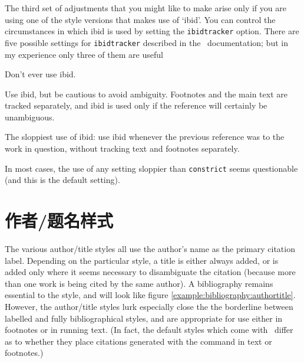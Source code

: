 \label{citations:ibid}
The third set of adjustments that you might like to make arise only if
you are using one of the style versions that makes use of `ibid'. You
can control the circumstances in which ibid is used by setting the
\verb|ibidtracker| option.\label{ibidtracking} There are five possible
settings for \verb|ibidtracker| described in the \biblatex\
documentation; but in my experience only three of them are useful
\begin{description}[font=\ttfamily\upshape]
\item[ibidtracker=false] Don't ever use ibid.
\item[ibidtracker=constrict] Use ibid, but be cautious to avoid
  ambiguity. Footnotes and the main text are tracked separately, and
  ibid is used only if the reference will certainly be unambiguous.
\item[ibidtracker=true] The sloppiest use of ibid: use ibid whenever
  the previous reference was to the work in question, without tracking
  text and footnotes separately.
\end{description}
In most cases, the use of any setting sloppier than \texttt{constrict}
seems questionable (and this is the default setting).

\section{作者/题名样式}

The various author/title styles all use the author's name as the
primary citation label. Depending on the particular style, a title is
either always added, or is added only where it seems necessary to
disambiguate the citation (because more than one work is being cited
by the same author). A bibliography remains essential to the style,
and will look like figure
\ref{example:bibliography:authortitle}. However, the author/title
styles lurk especially close the the borderline between labelled and
fully bibliographical styles, and are appropriate for use either in
footnotes or in running text. (In fact, the default styles which come
with \biblatex\ differ as to whether they place citations generated
with the \cs{autocite} command in text or footnotes.)

